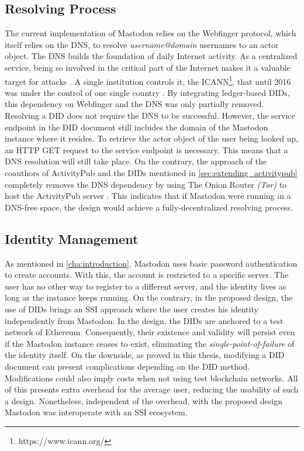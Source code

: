 \subsection{Resolving Process}
The current implementation of Mastodon relies on the Webfinger protocol, which itself relies on the DNS, to resolve \emph{username@domain} usernames to an actor object. The DNS builds the foundation of daily Internet activity. As a centralized service, being so involved in the critical part of the Internet makes it a valuable target for attacks \cite{carli2003security}. A single institution controls it, the ICANN\footnote{https://www.icann.org/}, that until 2016 was under the control of one single country \cite{lee_2016}. 
By integrating ledger-based DIDs, this dependency on Webfinger and the DNS was only partially removed. Resolving a DID does not require the DNS to be successful. However, the service endpoint in the DID document still includes the domain of the Mastodon instance where it resides. To retrieve the actor object of the user being looked up, an HTTP GET request to the service endpoint is necessary. This means that a DNS resolution will still take place. On the contrary, the approach of the coauthors of ActivityPub and the DIDs mentioned in \ref{sec:extending_activitypub} completely removes the DNS dependency by using The Onion Router \emph{(Tor)} to host the ActivityPub server \cite{webber_sporny_2017}. This indicates that if Mastodon were running in a DNS-free space, the design would achieve a fully-decentralized resolving process. 
 
\subsection{Identity Management} \label{ev:idm}

As mentioned in \ref{cha:introduction}, Mastodon uses basic password authentication to create accounts. With this, the account is restricted to a specific server. The user has no other way to register to a different server, and the identity lives as long as the instance keeps running. On the contrary, in the proposed design, the use of DIDs brings an SSI approach where the user creates his identity independently from Mastodon. In the design, the DIDs are anchored to a test network of Ethereum. Consequently, their existence and validity will persist even if the Mastodon instance ceases to exist, eliminating the \emph{single-point-of-failure} of the identity itself. On the downside, as proved in this thesis, modifying a DID document can present complications depending on the DID method. Modifications could also imply costs when not using test blockchain networks. All of this presents extra overhead for the average user, reducing the usability of such a design. Nonetheless, independent of the overhead, with the proposed design Mastodon was interoperate with an SSI ecosystem. 


